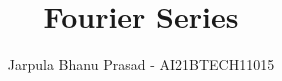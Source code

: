 \documentclass[journal,12pt,twocolumn]{IEEEtran}
\begin{document}
\let\StandardTheFigure\thefigure
\renewcommand{\thefigure}{\theproblem}



\def\putbox#1#2#3{\makebox[0in][l]{\makebox[#1][l]{}\raisebox{\baselineskip}[0in][0in]{\raisebox{#2}[0in][0in]{#3}}}}
     \def\rightbox#1{\makebox[0in][r]{#1}}
     \def\centbox#1{\makebox[0in]{#1}}
     \def\topbox#1{\raisebox{-\baselineskip}[0in][0in]{#1}}
     \def\midbox#1{\raisebox{-0.5\baselineskip}[0in][0in]{#1}}

\vspace{3cm}

\title{
Fourier Series
}


%
%
%

\author{Jarpula Bhanu Prasad - AI21BTECH11015}%
%
%
\end{document}
